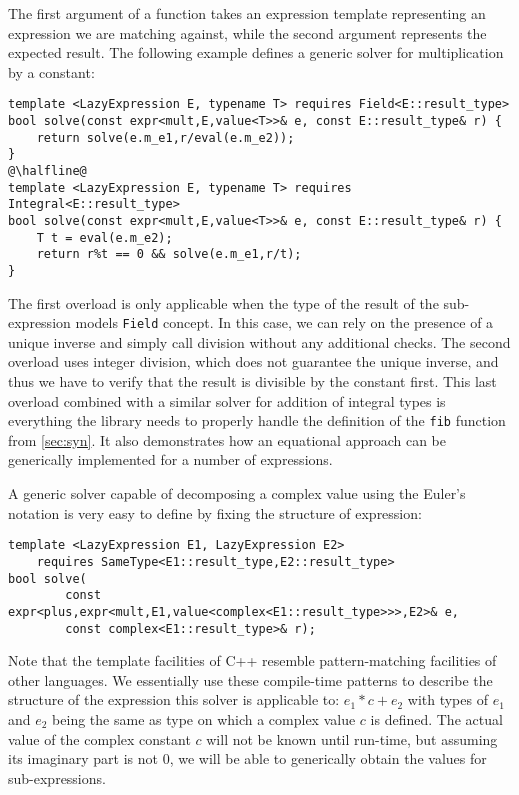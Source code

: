 \documentclass{llncs}
\makeatletter
\DeclareRobustCommand{\code}[1]{{\lstinline[keepspaces,breaklines=false,escapechar=@]{#1}}}
\makeatother
\begin{document}
The first argument of a function takes an expression template representing an 
expression we are matching against, while the second argument represents the 
expected result. The following example defines a generic solver for 
multiplication by a constant:

\begin{lstlisting}[keepspaces]
template <LazyExpression E, typename T> requires Field<E::result_type>
bool solve(const expr<mult,E,value<T>>& e, const E::result_type& r) {
    return solve(e.m_e1,r/eval(e.m_e2));
}
@\halfline@
template <LazyExpression E, typename T> requires Integral<E::result_type>
bool solve(const expr<mult,E,value<T>>& e, const E::result_type& r) {
    T t = eval(e.m_e2);
    return r%t == 0 && solve(e.m_e1,r/t);
}
\end{lstlisting}

\noindent
The first overload is only applicable when the type of the result of the 
sub-expression models \code{Field} concept. In this case, we can rely on the presence 
of a unique inverse and simply call division without any additional checks. The 
second overload uses integer division, which does not guarantee the unique 
inverse, and thus we have to verify that the result is divisible by the constant 
first. This last overload combined with a similar solver for addition of 
integral types is everything the library needs to properly handle the definition 
of the \code{fib} function from \textsection\ref{sec:syn}. It also demonstrates 
how an equational approach can be generically implemented for a number of 
expressions.

A generic solver capable of decomposing a complex value using the Euler's 
notation is very easy to define by fixing the structure of expression:

\begin{lstlisting}[keepspaces]
template <LazyExpression E1, LazyExpression E2> 
    requires SameType<E1::result_type,E2::result_type>
bool solve(
        const expr<plus,expr<mult,E1,value<complex<E1::result_type>>>,E2>& e, 
        const complex<E1::result_type>& r);
\end{lstlisting}

\noindent
Note that the template facilities of C++ resemble pattern-matching facilities of 
other languages. We essentially use these compile-time patterns to describe the 
structure of the expression this solver is applicable to: $e_1*c+e_2$ with types 
of $e_1$ and $e_2$ being the same as type on which a complex value $c$ is 
defined. The actual value of the complex constant $c$ will not be known until 
run-time, but assuming its imaginary part is not $0$, we will be able to 
generically obtain the values for sub-expressions.
\end{document}
